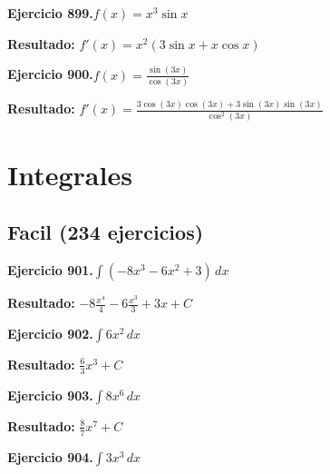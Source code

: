 \documentclass[10pt,a4paper]{article}
\begin{document}
\begin{ejbox}
\textbf{Ejercicio 899.}\quad $f(x) = x^{3} \sin x$
\end{ejbox}

\begin{solbox}
\textbf{Resultado:} \(\displaystyle f'(x) = x^{2}(3\sin x + x\cos x)\)
\end{solbox}

\begin{ejbox}
\textbf{Ejercicio 900.}\quad $f(x) = \frac{\sin(3x)}{\cos(3x)}$
\end{ejbox}

\begin{solbox}
\textbf{Resultado:} \(\displaystyle f'(x) = \frac{3\cos(3x)\cos(3x) + 3\sin(3x)\sin(3x)}{\cos^2(3x)}\)
\end{solbox}

\newpage
\newpage
\section{Integrales}

\subsection{Facil (234 ejercicios)}

\begin{ejbox}
\textbf{Ejercicio 901.}\quad $\int (-8x^3 -6x^2 +3)\,dx$
\end{ejbox}

\begin{solbox}
\textbf{Resultado:} \(\displaystyle -8\frac{x^4}{4} -6\frac{x^3}{3} +3x + C\)
\end{solbox}

\begin{ejbox}
\textbf{Ejercicio 902.}\quad $\int 6x^{2}\,dx$
\end{ejbox}

\begin{solbox}
\textbf{Resultado:} \(\displaystyle \frac{6}{3}x^{3} + C\)
\end{solbox}

\begin{ejbox}
\textbf{Ejercicio 903.}\quad $\int 8x^{6}\,dx$
\end{ejbox}

\begin{solbox}
\textbf{Resultado:} \(\displaystyle \frac{8}{7}x^{7} + C\)
\end{solbox}

\newpage
\begin{ejbox}
\textbf{Ejercicio 904.}\quad $\int 3x^{3}\,dx$
\end{ejbox}
\end{document}
